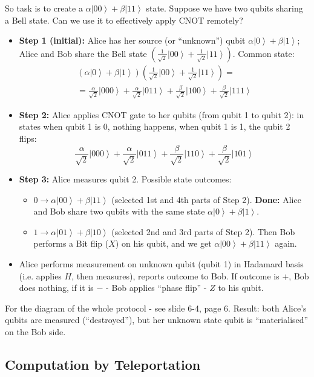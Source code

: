 \documentclass{scrartcl}
\newcommand{\ket}[1]{\left| #1 \right>} %
\begin{document}
So task is to create a $\alpha\ket{00} + \beta\ket{11}$ state. Suppose we have
two qubits sharing a Bell state. Can we use it to effectively apply CNOT
remotely?
\begin{itemize}
\item {\bf Step 1 (initial):} Alice has her source (or ``unknown'') qubit
  $\alpha\ket0 + \beta\ket1$; Alice and Bob share the Bell state
  $\left(\frac1{\sqrt{2}}\ket{00} + \frac1{\sqrt{2}}\ket{11}\right)$. Common
  state: \begin{gather*}(\alpha\ket0 +
    \beta\ket1)\left(\frac1{\sqrt{2}}\ket{00} + \frac1{\sqrt{2}}\ket{11}\right) = \\
    = \frac\alpha{\sqrt{2}}\ket{000} + \frac\alpha{\sqrt{2}}\ket{011}
    +\frac\beta{\sqrt{2}}\ket{100} + \frac\beta{\sqrt{2}}\ket{111}
  \end{gather*}

\item {\bf Step 2: } Alice applies CNOT gate to her qubits (from qubit 1 to
  qubit 2): in states when qubit 1 is 0, nothing happens, when qubit 1 is 1, the
  qubit 2 flips: $$\frac\alpha{\sqrt{2}}\ket{000} +
  \frac\alpha{\sqrt{2}}\ket{011} +\frac\beta{\sqrt{2}}\ket{110} +
  \frac\beta{\sqrt{2}}\ket{101}$$

\item {\bf Step 3:} Alice measures qubit 2. Possible state outcomes:
  \begin{itemize}
  \item $0 \to \alpha\ket{00} + \beta\ket{11}$ (selected 1st and 4th parts of
    Step 2). {\bf Done:} Alice and Bob share two qubits with the same state
    $\alpha\ket0 + \beta\ket1$.
  \item $1 \to \alpha\ket{01} + \beta\ket{10}$ (selected 2nd and 3rd parts of
    Step 2). Then Bob performs a Bit flip ($X$) on his qubit, and we get
    $\alpha\ket{00} + \beta\ket{11}$ again.
  \end{itemize}

\item Alice performs measurement on unknown qubit (qubit 1) in Hadamard basis
  (i.e. applies $H$, then measures), reports outcome to Bob. If outcome is $+$,
  Bob does nothing, if it is $-$ - Bob applies ``phase flip'' - $Z$ to his
  qubit.
\end{itemize}
For the diagram of the whole protocol - see slide 6-4, page 6. Result: both
Alice's qubits are measured (``destroyed''), but her unknown state qubit is
``materialised'' on the Bob side.

\subsection{Computation by Teleportation}
\label{sec:6-5}
\end{document}
